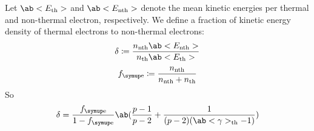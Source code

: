 \documentclass{notebook}
\begin{document}
\section*{}
Let \(\ab<E_{\thermal}>\) and \(\ab<E_{\mathrm{nth}}>\)
denote the mean kinetic energies per
thermal and non-thermal electron, respectively.
We define a fraction of kinetic energy density
of thermal electrons to non-thermal electrons:
\begin{equation}
  \delta
  \coloneq
  \frac{
    n_{\mathrm{nth}}\ab<E_{\mathrm{nth}}>
  }{
    n_{\thermal}\ab<E_{\thermal}>
  }
\end{equation}
\begin{equation}
  f_{\ele}
  \coloneq
  \frac{n_{\mathrm{nth}}}{n_{\mathrm{nth}}+n_{\thermal}}
\end{equation}
So
\begin{equation}
  \delta =
  \frac{f_{\ele}}{1-f_{\ele}}
  \ab(
    \frac{p-1}{p-2} + \frac{1}{(p-2)(\ab<\gamma>_{\thermal}-1)}
  )
\end{equation}
\end{document}
